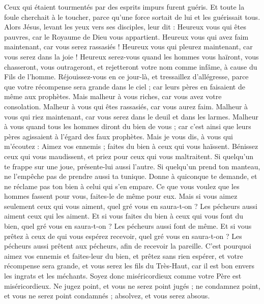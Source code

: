 \begin{multicols}{2}
Ceux qui étaient tourmentés par des esprits impurs furent guéris.
Et toute la foule cherchait à le toucher, parce qu’une force sortait de lui et les guérissait tous.
Alors Jésus, levant les yeux vers ses disciples, leur dit : Heureux vous qui êtes pauvres, car le Royaume de Dieu vous appartient.
Heureux vous qui avez faim maintenant, car vous serez rassasiés ! Heureux vous qui pleurez maintenant, car vous serez dans la joie !
Heureux serez-vous quand les hommes vous haïront, vous chasseront, vous outrageront, et rejetteront votre nom comme infâme, à cause du Fils de l'homme.
Réjouissez-vous en ce jour-là, et tressaillez d’allégresse, parce que votre récompense sera grande dans le ciel ; car leurs pères en faisaient de même aux prophètes.
Mais malheur à vous riches, car vous avez votre consolation.
Malheur à vous qui êtes rassasiés, car vous aurez faim. Malheur à vous qui riez maintenant, car vous serez dans le deuil et dans les larmes.
Malheur à vous quand tous les hommes diront du bien de vous ; car c’est ainsi que leurs pères agissaient à l’égard des faux prophètes.
Mais je vous dis, à vous qui m’écoutez : Aimez vos ennemis ; faites du bien à ceux qui vous haïssent.
Bénissez ceux qui vous maudissent, et priez pour ceux qui vous maltraitent.
Si quelqu’un te frappe sur une joue, présente-lui aussi l'autre. Si quelqu'un prend ton manteau, ne l'empêche pas de prendre aussi ta tunique.
Donne à quiconque te demande, et ne réclame pas ton bien à celui qui s’en empare.
Ce que vous voulez que les hommes fassent pour vous, faites-le de même pour eux.
Mais si vous aimez seulement ceux qui vous aiment, quel gré vous en saura-t-on ? Les pécheurs aussi aiment ceux qui les aiment.
Et si vous faites du bien à ceux qui vous font du bien, quel gré vous en saura-t-on ? Les pécheurs aussi font de même.
Et si vous prêtez à ceux de qui vous espérez recevoir, quel gré vous en saura-t-on ? Les pécheurs aussi prêtent aux pécheurs, afin de recevoir la pareille.
C'est pourquoi aimez vos ennemis et faites-leur du bien, et prêtez sans rien espérer, et votre récompense sera grande, et vous serez les fils du Très-Haut, car il est bon envers les ingrats et les méchants.
Soyez donc miséricordieux comme votre Père est miséricordieux.
Ne jugez point, et vous ne serez point jugés ; ne condamnez point, et vous ne serez point condamnés ; absolvez, et vous serez absous.

\end{multicols}
